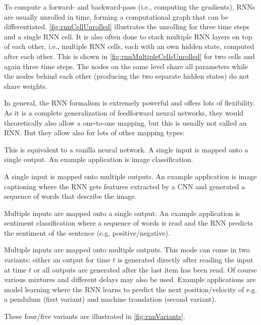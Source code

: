 	To compute a forward- and backward-pass (i.e., computing the gradients), RNNs are usually unrolled in time, forming a computational graph that can be differentiated. \autoref{fig:rnnCellUnrolled} illustrates the unrolling for three time steps and a single RNN cell. It is also often done to stack multiple RNN layers on top of each other, i.e., multiple RNN cells, each with an own hidden state, computed after each other. This is shown in \autoref{fig:rnnMultipleCellsUnrolled} for two cells and again three time steps. The nodes on the same level share all parameters while the nodes behind each other (producing the two separate hidden states) do not share weights.

	In general, the RNN formalism is extremely powerful and offers lots of flexibility. As it is a complete generalization of feedforward neural networks, they would theoretically also allow a one-to-one mapping, but this is usually not called an RNN. But they allow also for lots of other mapping types:
	\begin{description}[leftmargin = 3cm]
		\item[One-to-One]   This is equivalent to a vanilla neural network. A single input is mapped onto a single output. An example application is image classification.
		\item[One-to-Many]  A single input is mapped onto multiple outputs. An example application is image captioning where the RNN gets features extracted by a CNN and generated a sequence of words that describe the image.
		\item[Many-to-One]  Multiple inputs are mapped onto a single output. An example application is sentiment classification where a sequence of words is read and the RNN predicts the sentiment of the sentence (e.g. positive/negative).
		\item[Many-to-Many] Multiple inputs are mapped onto multiple outputs. This mode can come in two variants: either an output for time \(t\) is generated directly after reading the input at time \(t\) or all outputs are generated after the last item has been read. Of course various mixtures and different delays may also be used. Example applications are model learning where the RNN learns to predict the next position/velocity of e.g. a pendulum (first variant) and machine translation (second variant).
	\end{description}
	These four/five variants are illustrated in \autoref{fig:rnnVariants}.

